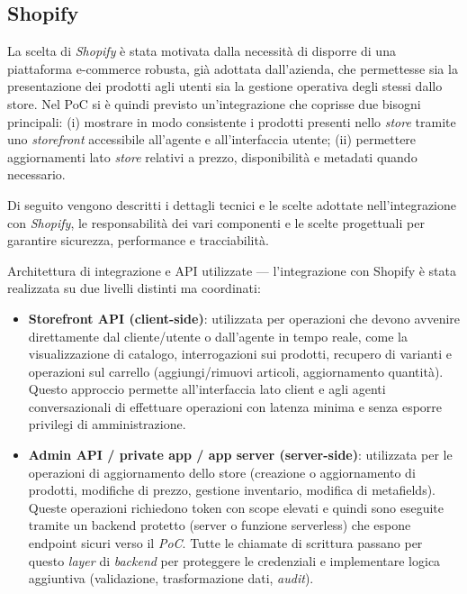 \subsection{Shopify}

La scelta di \emph{Shopify} è stata motivata dalla necessità di disporre di una piattaforma e-commerce robusta, già adottata dall'azienda, che permettesse 
sia la presentazione dei prodotti agli utenti sia la gestione operativa degli stessi dallo store. Nel PoC si è quindi previsto un'integrazione che coprisse due bisogni principali: 
(i) mostrare in modo consistente i prodotti presenti nello \emph{store} tramite uno \emph{storefront} accessibile all'agente e all'interfaccia utente; 
(ii) permettere aggiornamenti lato \emph{store} relativi a prezzo, disponibilità e metadati quando necessario.

Di seguito vengono descritti i dettagli tecnici e le scelte adottate nell'integrazione con \emph{Shopify}, 
le responsabilità dei vari componenti e le scelte progettuali per garantire sicurezza, performance e tracciabilità.

Architettura di integrazione e API utilizzate — l'integrazione con Shopify è stata realizzata su due livelli distinti ma coordinati:
\begin{itemize}
\item \textbf{Storefront API (client-side)}: utilizzata per operazioni che devono avvenire direttamente dal cliente/utente o dall'agente in tempo reale, 
come la visualizzazione di catalogo, interrogazioni sui prodotti, recupero di varianti e operazioni sul carrello (aggiungi/rimuovi articoli, aggiornamento quantità). 
Questo approccio permette all'interfaccia lato client e agli agenti conversazionali di effettuare operazioni con latenza minima e senza esporre privilegi di amministrazione.
\item \textbf{Admin API / private app / app server (server-side)}: utilizzata per le operazioni di aggiornamento dello store 
(creazione o aggiornamento di prodotti, modifiche di prezzo, gestione inventario, modifica di metafields). 
Queste operazioni richiedono token con scope elevati e quindi sono eseguite tramite un backend protetto (server o funzione serverless) che espone endpoint sicuri verso il \emph{PoC}. 
Tutte le chiamate di scrittura passano per questo \emph{layer} di \emph{backend} per proteggere le credenziali e implementare logica aggiuntiva (validazione, trasformazione dati, \emph{audit}).
\end{itemize}

